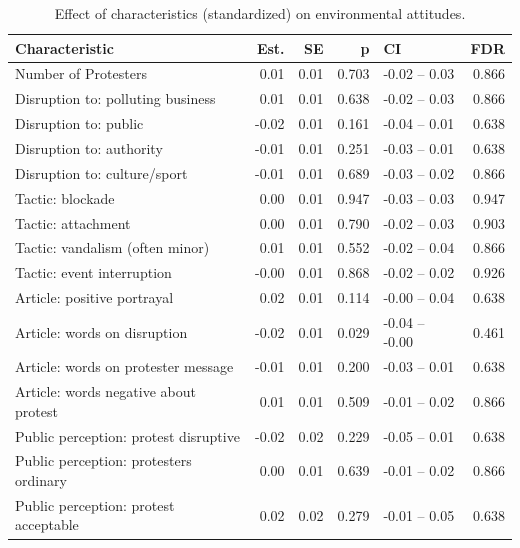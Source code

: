 \begin{table}[h!t]
\centering
\begin{tabular}{lrrrlr}
  \hline
Characteristic & Est. & SE & p & CI & FDR \\ 
  \hline
Number of Protesters & 0.01 & 0.01 & 0.703 & -0.02 -- 0.03 & 0.866 \\ 
  Disruption to: polluting business & 0.01 & 0.01 & 0.638 & -0.02 -- 0.03 & 0.866 \\ 
  Disruption to: public & -0.02 & 0.01 & 0.161 & -0.04 -- 0.01 & 0.638 \\ 
  Disruption to: authority & -0.01 & 0.01 & 0.251 & -0.03 -- 0.01 & 0.638 \\ 
  Disruption to: culture/sport & -0.01 & 0.01 & 0.689 & -0.03 -- 0.02 & 0.866 \\ 
  Tactic: blockade & 0.00 & 0.01 & 0.947 & -0.03 -- 0.03 & 0.947 \\ 
  Tactic: attachment & 0.00 & 0.01 & 0.790 & -0.02 -- 0.03 & 0.903 \\ 
  Tactic: vandalism (often minor) & 0.01 & 0.01 & 0.552 & -0.02 -- 0.04 & 0.866 \\ 
  Tactic: event interruption & -0.00 & 0.01 & 0.868 & -0.02 -- 0.02 & 0.926 \\ 
  Article: positive portrayal & 0.02 & 0.01 & 0.114 & -0.00 -- 0.04 & 0.638 \\ 
  Article: words on disruption & -0.02 & 0.01 & 0.029 & -0.04 -- -0.00 & 0.461 \\ 
  Article: words on protester message & -0.01 & 0.01 & 0.200 & -0.03 -- 0.01 & 0.638 \\ 
  Article: words negative about protest & 0.01 & 0.01 & 0.509 & -0.01 -- 0.02 & 0.866 \\ 
  Public perception: protest disruptive & -0.02 & 0.02 & 0.229 & -0.05 -- 0.01 & 0.638 \\ 
  Public perception: protesters ordinary & 0.00 & 0.01 & 0.639 & -0.01 -- 0.02 & 0.866 \\ 
  Public perception: protest acceptable & 0.02 & 0.02 & 0.279 & -0.01 -- 0.05 & 0.638 \\ 
   \hline
\end{tabular}
\caption{Effect of characteristics (standardized) on environmental attitudes.} 
\label{tab:char_stand}
\end{table}
